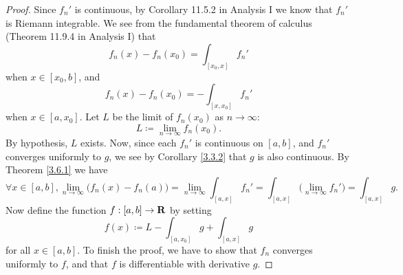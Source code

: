 \begin{proof}
    Since \(f_n'\) is continuous, by Corollary 11.5.2 in Analysis I we know that \(f_n'\) is Riemann integrable.
    We see from the fundamental theorem of calculus (Theorem 11.9.4 in Analysis I) that
    \[
        f_n(x) - f_n(x_0) = \int_{[x_0, x]} f_n'
    \]
    when \(x \in [x_0, b]\), and
    \[
        f_n(x) - f_n(x_0) = -\int_{[x, x_0]} f_n'
    \]
    when \(x \in [a, x_0]\).
    Let \(L\) be the limit of \(f_n(x_0)\) as \(n \to \infty\):
    \[
        L \coloneqq \lim_{n \to \infty} f_n(x_0).
    \]
    By hypothesis, \(L\) exists.
    Now, since each \(f_n'\) is continuous on \([a, b]\), and \(f_n'\) converges uniformly to \(g\), we see by Corollary \ref{3.3.2} that \(g\) is also continuous.
    By Theorem \ref{3.6.1} we have
    \[
        \forall x \in [a, b], \lim_{n \to \infty} \big(f_n(x) - f_n(a)\big) = \lim_{n \to \infty} \int_{[a, x]} f_n' = \int_{[a, x]} \big(\lim_{n \to \infty} f_n'\big) = \int_{[a, x]} g.
    \]
    Now define the function \(f : [a, b] \to \mathbf{R}\) by setting
    \[
        f(x) \coloneqq L - \int_{[a, x_0]} g + \int_{[a, x]} g
    \]
    for all \(x \in [a, b]\).
    To finish the proof, we have to show that \(f_n\) converges uniformly to \(f\), and that \(f\) is differentiable with derivative \(g\).


\end{proof}
